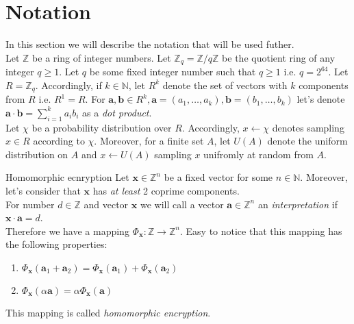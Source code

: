 \section{Notation}
	In this section we will describe the notation that will be used futher. \\
	Let $ \mathbb{Z} $ be a ring of integer numbers. Let $ \mathbb{Z}_q = \mathbb{Z} / q\mathbb{Z} $ be the quotient ring of any integer $ q \geq 1 $. Let $ q $ be some fixed integer number such that $ q \geq 1 $ i.e. $ q = 2^{64} $. Let $ R = \mathbb{Z}_q $. Accordingly, if $ k \in \mathbb{N} $, let $ R^k $ denote the set of vectors with $ k $ components from $ R $ i.e.  $ R^1 = R $. For $ \textbf{a}, \textbf{b} \in R^k, \textbf{a} = (a_1, \dots, a_k), \textbf{b} = ( b_1, \dots, b_k ) $ let's denote $ \textbf{a} \cdot \textbf{b} = \sum_{i = 1}^{k} a_i b_i $ as a \textit{dot product}. \\
	Let $ \chi $ be a probability distribution over $ R $. Accordingly, $ x \leftarrow \chi $ denotes sampling $ x \in R $ according to $ \chi $. Moreover, for a finite set $ A $, let $ U(A) $ denote the uniform distribution on $ A $ and $ x \leftarrow U(A) $ sampling $ x $ unifromly at random from $ A $.
	\begin{definition}{Homomorphic ecnryption}
		Let $ \textbf{x} \in \mathbb{Z}^n $ be a fixed vector for some $ n \in \mathbb{N} $. Moreover, let's consider that $ \textbf{x} $ has \textit{at least} 2 coprime components. \\
		For number $ d \in \mathbb{Z} $ and vector $ \textbf{x} $ we will call a vector $ \textbf{a} \in \mathbb{Z}^n $ an \textit{interpretation} if $ \textbf{x} \cdot \textbf{a} = d $. \\
		Therefore we have a mapping $ \Phi_{\textbf{x}}: \mathbb{Z} \rightarrow \mathbb{Z}^n $. Easy to notice that this mapping has the following properties:
		\begin{enumerate}
			\item $ \Phi_{\textbf{x}}(\textbf{a}_1 + \textbf{a}_2) = \Phi_{\textbf{x}}(\textbf{a}_1) + \Phi_{\textbf{x}}(\textbf{a}_2) $
			\item $ \Phi_{\textbf{x}}(\alpha \textbf{a}) = \alpha \Phi_{\textbf{x}}(\textbf{a}) $
		\end{enumerate}
		This mapping is called \textit{homomorphic encryption}.
	\end{definition}
		